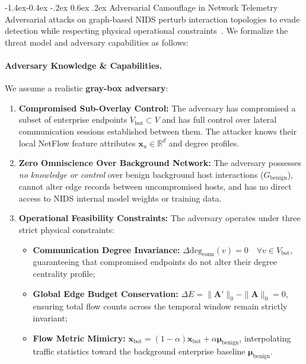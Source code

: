 \documentclass[10pt,twocolumn,letterpaper]{article}
\makeatletter
\renewcommand\subsection{\@startsection{subsection}{2}{\z@}%
                                     {-1.4ex\@plus -0.4ex \@minus -.2ex}%
                                     {0.6ex \@plus .2ex}%
                                     {\normalfont\normalsize\bfseries}}
\makeatother
\begin{document}
\subsection{Adversarial Camouflage in Network Telemetry}
\label{sec:threat_model}
Adversarial attacks on graph-based NIDS perturb interaction topologies to evade detection while respecting physical operational constraints~\cite{zhou2022hierarchical}. We formalize the threat model and adversary capabilities as follows:

\paragraph{Adversary Knowledge \& Capabilities.}
We assume a realistic \textbf{gray-box adversary}:
\begin{enumerate}
    \item \textbf{Compromised Sub-Overlay Control:} The adversary has compromised a subset of enterprise endpoints $V_{\text{bot}} \subset V$ and has full control over lateral communication sessions established between them. The attacker knows their local NetFlow feature attributes $\mathbf{x}_u \in \mathbb{R}^d$ and degree profiles.
    \item \textbf{Zero Omniscience Over Background Network:} The adversary possesses \textit{no knowledge or control} over benign background host interactions ($G_{\text{benign}}$), cannot alter edge records between uncompromised hosts, and has no direct access to NIDS internal model weights or training data.
    \item \textbf{Operational Feasibility Constraints:} The adversary operates under three strict physical constraints:
    \begin{itemize}
        \item \textbf{Communication Degree Invariance:} $\Delta \mathrm{deg}_{\text{conn}}(v) = 0 \quad \forall v \in V_{\text{bot}}$, guaranteeing that compromised endpoints do not alter their degree centrality profile;
        \item \textbf{Global Edge Budget Conservation:} $\Delta E = \|\mathbf{A}'\|_0 - \|\mathbf{A}\|_0 = 0$, ensuring total flow counts across the temporal window remain strictly invariant;
        \item \textbf{Flow Metric Mimicry:} $\mathbf{x}_{\text{bot}} = (1 - \alpha)\mathbf{x}_{\text{bot}} + \alpha \boldsymbol{\mu}_{\text{benign}}$, interpolating traffic statistics toward the background enterprise baseline $\boldsymbol{\mu}_{\text{benign}}$.
    \end{itemize}
\end{enumerate}
\end{document}
